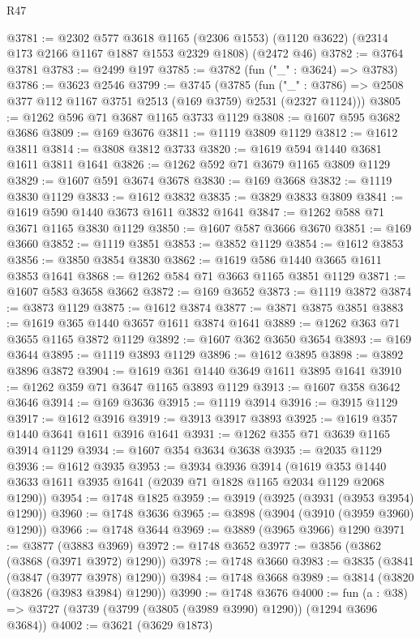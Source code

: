 \begin{lexlean}{R47}
\begin{coremodule}
@3781 := @2302
    @577
    @3618
    @1165
    (@2306 @1553)
    (@1120 @3622)
    (@2314 @173 @2166 @1167 @1887 @1553 @2329 @1808)
    (@2472 @46)
@3782 := @3764 @3781
@3783 := @2499 @197
@3785 := @3782 (fun ("_" : @3624) => @3783)
@3786 := @3623 @2546
@3799 := @3745
    (@3785
      (fun ("_" : @3786) => @2508 @377 @112 @1167 @3751 @2513 (@169 @3759) @2531 (@2327 @1124)))
@3805 := @1262 @596 @71 @3687 @1165 @3733 @1129
@3808 := @1607 @595 @3682 @3686
@3809 := @169 @3676
@3811 := @1119 @3809 @1129
@3812 := @1612 @3811
@3814 := @3808 @3812 @3733
@3820 := @1619 @594 @1440 @3681 @1611 @3811 @1641
@3826 := @1262 @592 @71 @3679 @1165 @3809 @1129
@3829 := @1607 @591 @3674 @3678
@3830 := @169 @3668
@3832 := @1119 @3830 @1129
@3833 := @1612 @3832
@3835 := @3829 @3833 @3809
@3841 := @1619 @590 @1440 @3673 @1611 @3832 @1641
@3847 := @1262 @588 @71 @3671 @1165 @3830 @1129
@3850 := @1607 @587 @3666 @3670
@3851 := @169 @3660
@3852 := @1119 @3851
@3853 := @3852 @1129
@3854 := @1612 @3853
@3856 := @3850 @3854 @3830
@3862 := @1619 @586 @1440 @3665 @1611 @3853 @1641
@3868 := @1262 @584 @71 @3663 @1165 @3851 @1129
@3871 := @1607 @583 @3658 @3662
@3872 := @169 @3652
@3873 := @1119 @3872
@3874 := @3873 @1129
@3875 := @1612 @3874
@3877 := @3871 @3875 @3851
@3883 := @1619 @365 @1440 @3657 @1611 @3874 @1641
@3889 := @1262 @363 @71 @3655 @1165 @3872 @1129
@3892 := @1607 @362 @3650 @3654
@3893 := @169 @3644
@3895 := @1119 @3893 @1129
@3896 := @1612 @3895
@3898 := @3892 @3896 @3872
@3904 := @1619 @361 @1440 @3649 @1611 @3895 @1641
@3910 := @1262 @359 @71 @3647 @1165 @3893 @1129
@3913 := @1607 @358 @3642 @3646
@3914 := @169 @3636
@3915 := @1119 @3914
@3916 := @3915 @1129
@3917 := @1612 @3916
@3919 := @3913 @3917 @3893
@3925 := @1619 @357 @1440 @3641 @1611 @3916 @1641
@3931 := @1262 @355 @71 @3639 @1165 @3914 @1129
@3934 := @1607 @354 @3634 @3638
@3935 := @2035 @1129
@3936 := @1612 @3935
@3953 := @3934
    @3936
    @3914
    (@1619 @353 @1440 @3633 @1611 @3935 @1641 (@2039 @71 @1828 @1165 @2034 @1129 @2068 @1290))
@3954 := @1748 @1825
@3959 := @3919 (@3925 (@3931 (@3953 @3954) @1290))
@3960 := @1748 @3636
@3965 := @3898 (@3904 (@3910 (@3959 @3960) @1290))
@3966 := @1748 @3644
@3969 := @3889 (@3965 @3966) @1290
@3971 := @3877 (@3883 @3969)
@3972 := @1748 @3652
@3977 := @3856 (@3862 (@3868 (@3971 @3972) @1290))
@3978 := @1748 @3660
@3983 := @3835 (@3841 (@3847 (@3977 @3978) @1290))
@3984 := @1748 @3668
@3989 := @3814 (@3820 (@3826 (@3983 @3984) @1290))
@3990 := @1748 @3676
@4000 := fun (a : @38) => @3727 (@3739 (@3799 (@3805 (@3989 @3990) @1290)) (@1294 @3696 @3684))
@4002 := @3621 (@3629 @1873)

\end{coremodule}
\end{lexlean}
